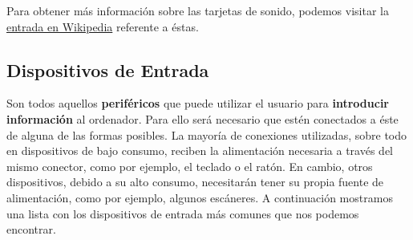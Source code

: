 Para obtener más información sobre las tarjetas de sonido, podemos visitar la \href{https://es.wikipedia.org/wiki/Tarjeta_de_sonido}{entrada en Wikipedia} referente a éstas.

\subsection{Dispositivos de Entrada}
Son todos aquellos \textbf{periféricos} que puede utilizar el usuario para \textbf{introducir información} al ordenador. Para ello será necesario que estén conectados a éste de alguna de las formas posibles. La mayoría de conexiones utilizadas, sobre todo en dispositivos de bajo consumo, reciben la alimentación necesaria a través del mismo conector, como por ejemplo, el teclado o el ratón. En cambio, otros dispositivos, debido a su alto consumo, necesitarán tener su propia fuente de alimentación, como por ejemplo, algunos escáneres. A continuación mostramos una lista con los dispositivos de entrada más comunes que nos podemos encontrar.

